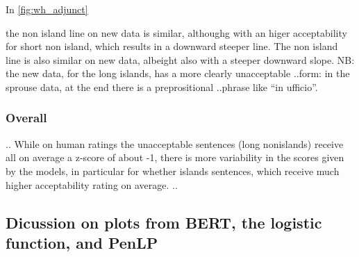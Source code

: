 In \autoref{fig:wh_adjunct}

the non island line on new data is similar, althoughg with an higer acceptability for short non island, which results in a downward steeper line. The non island line is also similar on new data, albeight also with a steeper downward slope.
NB: the new data, for the long islands, has a more clearly unacceptable ..form: in the sprouse data, at the end there is a preprositional ..phrase like “in ufficio”.

\subsubsection{Overall}
..
While on human ratings the unacceptable sentences (long nonislands) receive all on average a z-score of about -1, there is more variability in the scores given by the models, in particular for whether islands sentences, which receive much higher acceptability rating on average.
..






\subsection{Dicussion on plots from BERT, the logistic function, and PenLP}



